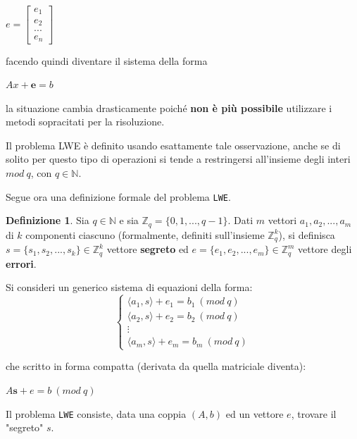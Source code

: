 \documentclass[a4paper, 12pt, oneside]{article}
\theoremstyle{definition}
\newtheorem{definition}{Definizione}
\begin{document}
\begin{center}
    $e = \begin{bmatrix}
        e_1 \\ e_2 \\ ... \\ e_n
    \end{bmatrix}$
\end{center}

facendo quindi diventare il sistema della forma 

\begin{center}
    $Ax + \mathbf{e} = b$
\end{center}

la situazione cambia drasticamente poiché \textbf{non è più possibile} utilizzare i metodi sopracitati per la risoluzione.

Il problema LWE è definito usando esattamente tale osservazione, anche se di solito per questo tipo di operazioni si tende a restringersi all'insieme degli interi $mod \: q$, con $q \in \mathbb{N}$.

Segue ora una definizione formale \cite{lwe-definition} del problema \texttt{LWE}.

\begin{definition}
    Sia $q \in \mathbb{N}$ e sia $\mathbb{Z}_q = \{0, 1, ..., q - 1\}$. Dati $m$ vettori $a_1, a_2, ..., a_m$ di $k$ componenti ciascuno (formalmente, definiti sull'insieme $\mathbb{Z}^k_q$), si definisca $s = \{s_1, s_2, ..., s_k\} \in \mathbb{Z}^k_q$ vettore \textbf{segreto} ed $e = \{e_1, e_2, ..., e_m\} \in \mathbb{Z}^m_q$ vettore degli \textbf{errori}.

    Si consideri un generico sistema di equazioni della forma:
    \[
        \left\{ 
        \begin{array}{l}
            \langle a_1, s \rangle + e_1 = b_1 \: (mod \: q) \\
            \langle a_2, s \rangle + e_2 = b_2 \: (mod \: q) \\
            \vdots \\
            \langle a_m, s \rangle + e_m = b_m \: (mod \: q)
        \end{array} 
    \right.
    \]

    che scritto in forma compatta (derivata da quella matriciale diventa):

    \begin{center}
        $A\mathbf{s} + e = b \: (mod \: q)$
    \end{center}

    Il problema \texttt{LWE} consiste, data una coppia $(A, b)$ ed un vettore $e$, trovare il "segreto" $s$. 

\end{definition}
\end{document}
